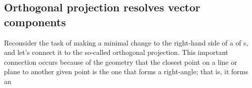 %





\subsection{Orthogonal projection resolves vector components}
\label{sec:proj}

Reconsider the task of making a minimal change to the right-hand side of a  of s, and let's connect it to the so-called orthogonal projection.
This important connection occurs because of the geometry that the closest point on a line or plane to another given point is the one that forms a right-angle; that is, it forms an 

